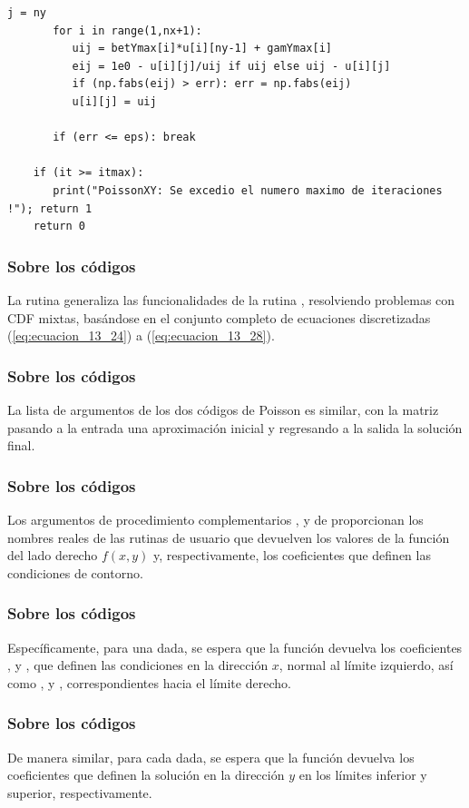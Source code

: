 \documentclass[12pt]{beamer}
\begin{document}
\begin{frame}
\begin{lstlisting}[caption=Código para la función \texttt{PoissonXY}]
       j = ny
       for i in range(1,nx+1):
          uij = betYmax[i]*u[i][ny-1] + gamYmax[i]
          eij = 1e0 - u[i][j]/uij if uij else uij - u[i][j]
          if (np.fabs(eij) > err): err = np.fabs(eij)
          u[i][j] = uij
 
       if (err <= eps): break
 
    if (it >= itmax):
       print("PoissonXY: Se excedio el numero maximo de iteraciones !"); return 1
    return 0
\end{lstlisting}
\end{frame}
\begin{frame}
\frametitle{Sobre los códigos}
La rutina  generaliza las funcionalidades de la rutina , resolviendo problemas con CDF mixtas, basándose en el conjunto completo de ecuaciones discretizadas (\ref{eq:ecuacion_13_24}) a (\ref{eq:ecuacion_13_28}).
\end{frame}
\begin{frame}
\frametitle{Sobre los códigos}
La lista de argumentos de los dos códigos de Poisson es similar, con la matriz  pasando a la entrada una aproximación inicial y regresando a la salida la solución final.
\end{frame}
\begin{frame}
\frametitle{Sobre los códigos}
Los argumentos de procedimiento complementarios ,  y  de  proporcionan los nombres reales de las rutinas de usuario que devuelven los valores de la función del lado derecho $f (x, y)$ y, respectivamente, los coeficientes que definen las condiciones de contorno.
\end{frame}
\begin{frame}
\frametitle{Sobre los códigos}
Específicamente, para una  dada, se espera que la función  devuelva los coeficientes ,  y , que definen las condiciones en la dirección $x$, normal al límite izquierdo, así como ,  y , correspondientes hacia el límite derecho.
\end{frame}
\begin{frame}
\frametitle{Sobre los códigos}
De manera similar, para cada  dada, se espera que la función  devuelva los coeficientes que definen la solución en la dirección $y$ en los límites inferior y superior, respectivamente.
\end{frame}
\end{document}
